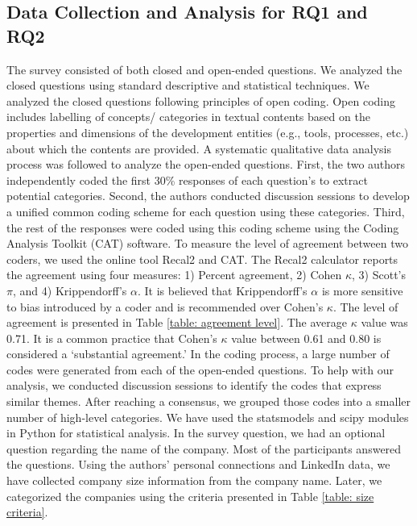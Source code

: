 \subsection{Data Collection and Analysis for RQ1 and RQ2}
\label{survey_data_collection}
The survey consisted of both closed and open-ended questions. 
We analyzed the closed questions using standard descriptive and statistical techniques. We analyzed the 
closed questions following principles of open coding. Open coding includes labelling of concepts/
categories in textual contents based on the properties and
dimensions of the development entities (e.g., tools, processes, etc.) about which the contents
are provided. A systematic qualitative data analysis process was followed to analyze the
open-ended questions. First, the two authors independently coded the first 30\%
responses of each question's to extract potential categories. Second, the
authors conducted discussion sessions to develop a unified common coding scheme
for each question using these categories. Third, the rest of the responses were
coded using this coding scheme using the Coding Analysis Toolkit
(CAT)\cite{Lu2008} software. To measure the level of agreement between two
coders, we used the online tool Recal2\cite{Recal2020} and CAT\cite{Lu2008}. The
Recal2 calculator reports the agreement using four measures: 1) Percent
agreement, 2) Cohen $\kappa$\cite{Cohen1960}, 3) Scott’s $\pi$\cite{scott1955},
and 4) Krippendorff’s $\alpha$\cite{krippendorff2004}. It is believed that
Krippendorff’s $\alpha$ is more sensitive to bias introduced by a coder and is
recommended\cite{Joyce2013} over Cohen's $\kappa$\cite{Cohen1960}. The level of
agreement is presented in Table \ref{table: agreement level}. The average
$\kappa$ value was 0.71. It is a common practice that Cohen's $\kappa$ value
between 0.61 and 0.80\cite{Landis1977} is considered a `substantial agreement.’
In the coding process, a large number of codes were generated from each of the
open-ended questions. To help with our analysis, we conducted discussion
sessions to identify the codes that express similar themes. After reaching a
consensus, we grouped those codes into a smaller number of high-level
categories. We have used the statsmodels\cite{seabold2010} and
scipy\cite{scipy2020} modules in Python for statistical analysis. In the survey
question, we had an optional question regarding the name of the company. Most of
the participants answered the questions. Using the authors' personal connections
and LinkedIn data, we have collected company size information from the company
name. Later, we categorized the companies using the criteria presented in Table
\ref{table: size criteria}.


